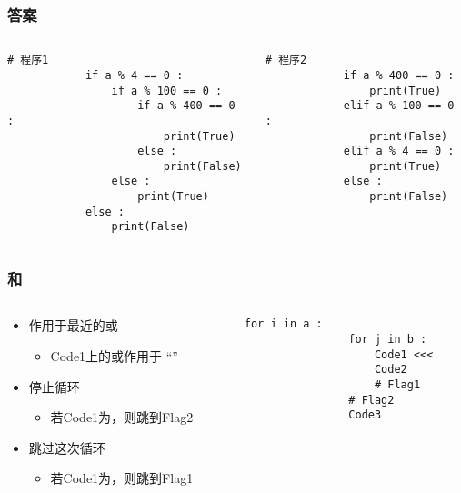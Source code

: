 \begin{frame} [fragile]
	\frametitle{答案}
	\linespread{1.25}
	\begin{columns}[T]
		\begin{column}[T]{.5\textwidth}
			\begin{lstlisting}[style=pythonstyle, tabsize=2, gobble=6, texcl]
			# 程序1
			if a % 4 == 0 :
				if a % 100 == 0 :
					if a % 400 == 0 :
						print(True)
					else :
						print(False)
				else :
					print(True)
			else :
				print(False)
			\end{lstlisting}
		\end{column}
		\begin{column}[T]{.47\textwidth}
			\begin{lstlisting}[style=pythonstyle, tabsize=2, gobble=6, texcl]
			# 程序2
			if a % 400 == 0 :
				print(True)
			elif a % 100 == 0 :
				print(False)
			elif a % 4 == 0 :
				print(True)
			else :
				print(False)
			\end{lstlisting}
		\end{column}
	\end{columns}
\end{frame}

\begin{frame} [fragile]
	\frametitle{和}
	\linespread{1.25}
	\begin{columns}[T]
		\begin{column}[T]{.52\textwidth}
			\begin{itemize}
			\item 作用于最近的或
				\begin{itemize}
				\item Code1上的或作用于
						``''
				\end{itemize}
			\item {}停止循环
				\begin{itemize}
				\item 若Code1为，则跳到Flag2
				\end{itemize}
			\item {}跳过这次循环
				\begin{itemize}
				\item 若Code1为，则跳到Flag1
				\end{itemize}
			\end{itemize}
		\end{column}
		\begin{column}[T]{.48\textwidth}
			\begin{lstlisting}[style=pythonstyle, gobble=12]
			for i in a :
				for j in b :
					Code1 <<<
					Code2
					# Flag1
				# Flag2
				Code3
			\end{lstlisting}
		\end{column}
	\end{columns}
\end{frame}

